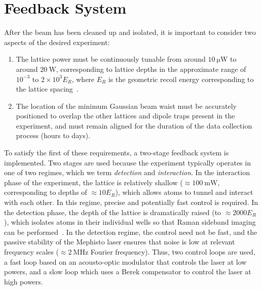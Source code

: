 \documentclass[twocolumn,aip,rsi,reprint,bibnotes]{revtex4-1}
\newcommand\unit[2]{\ensuremath{#1~\mathrm{{#2}}}}
\begin{document}
\section{Feedback System}

After the beam has been cleaned up and isolated, it is important to consider two aspects of the desired experiment:
\begin{enumerate}
\item The lattice power must be continuously tunable from around \unit{10}{\mu{}W} to around \unit{20}{W}, corresponding to lattice depths in the approximate range of $10^{-3}$ to $2 \times 10^3 E_R$, where $E_R$ is the geometric recoil energy corresponding to the lattice spacing~\cite{Blatt2015}.
\item The location of the minimum Gaussian beam waist must be accurately positioned to overlap the other lattices and dipole traps present in the experiment, and must remain aligned for the duration of the data collection process (hours to days).
\end{enumerate}
To satisfy the first of these requirements, a two-stage feedback system is implemented.
Two stages are used because the experiment typically operates in one of two regimes, which we term \emph{detection} and \emph{interaction}.
In the interaction phase of the experiment, the lattice is relatively shallow ($\approx \unit{100}{mW}$, corresponding to depths of $\approx 10 E_R$), which allows atoms to tunnel and interact with each other.
In this regime, precise and potentially fast control is required.
In the detection phase, the depth of the lattice is dramatically raised (to $\approx 2000 E_R$), which isolates atoms in their individual wells so that Raman sideband imaging can be performed~\cite{Parsons2015}.
In the detection regime, the control need not be fast, and the passive stability of the Mephisto laser ensures that noise is low at relevant frequency scales ($\approx\unit{2}{MHz}$ Fourier frequency).
Thus, two control loops are used, a fast loop based on an acousto-optic modulator that controls the laser at low powers, and a slow loop which uses a Berek compensator to control the laser at high powers.
\end{document}
